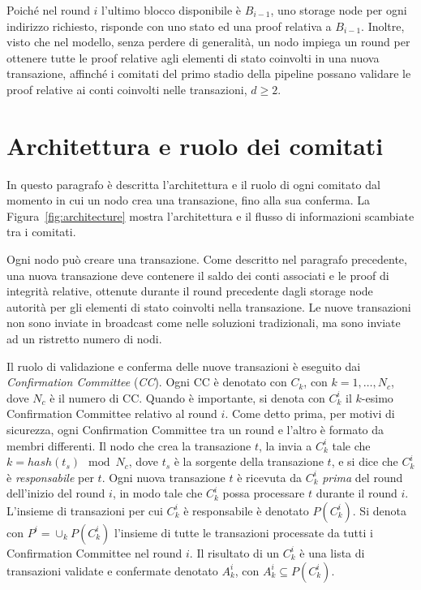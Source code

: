 Poiché nel round $i$ l'ultimo blocco disponibile è $B_{i-1}$, uno storage node per ogni indirizzo richiesto, risponde con uno stato ed una proof relativa a $B_{i-1}$. Inoltre, visto che nel modello, senza perdere di generalità, un nodo impiega un round per ottenere tutte le proof relative agli elementi di stato coinvolti in una nuova transazione, affinché i comitati del primo stadio della pipeline possano validare le proof relative ai conti coinvolti nelle transazioni, $d \geq 2$.

\section{Architettura e ruolo dei comitati}

In questo paragrafo è descritta l'architettura e il ruolo di ogni comitato dal momento in cui un nodo crea una transazione, fino alla sua conferma. La Figura~\ref{fig:architecture} mostra l'architettura e il flusso di informazioni scambiate tra i comitati.

Ogni nodo può creare una transazione. Come descritto nel paragrafo precedente, una nuova transazione deve contenere il saldo dei conti associati e le proof di integrità relative, ottenute durante il round precedente dagli storage node autorità per gli elementi di stato coinvolti nella transazione. Le nuove transazioni non sono inviate in broadcast come nelle soluzioni tradizionali, ma sono inviate ad un ristretto numero di nodi.

Il ruolo di validazione e conferma delle nuove transazioni è eseguito dai \emph{Confirmation Committee} (\emph{CC}). Ogni CC è denotato con $C_k$, con $k = 1, \dots, N_c$, dove $N_c$ è il numero di CC. Quando è importante, si denota con $C_k^i$ il $k$-esimo Confirmation Committee relativo al round $i$. Come detto prima, per motivi di sicurezza, ogni Confirmation Committee tra un round e l'altro è formato da membri differenti. Il nodo che crea la transazione $t$, la invia a $C_k^i$ tale che $k = hash(t_s) \mod N_c$, dove $t_s$ è la sorgente della transazione $t$, e si dice che $C_k^i$ è \emph{responsabile} per $t$. Ogni nuova transazione $t$ è ricevuta da $C_k^i$ \emph{prima} del round dell'inizio del round $i$, in modo tale che $C_k^i$ possa processare $t$ durante il round $i$. L'insieme di transazioni per cui $C_k^i$ è responsabile è denotato $P(C_k^i)$. Si denota con $P^i = \cup_k P(C_k^i)$ l'insieme di tutte le transazioni processate da tutti i Confirmation Committee nel round $i$. Il risultato di un $C_k^i$ è una lista di transazioni validate e confermate denotato $A_k^i$, con $A_k^i \subseteq P(C_k^i)$.

